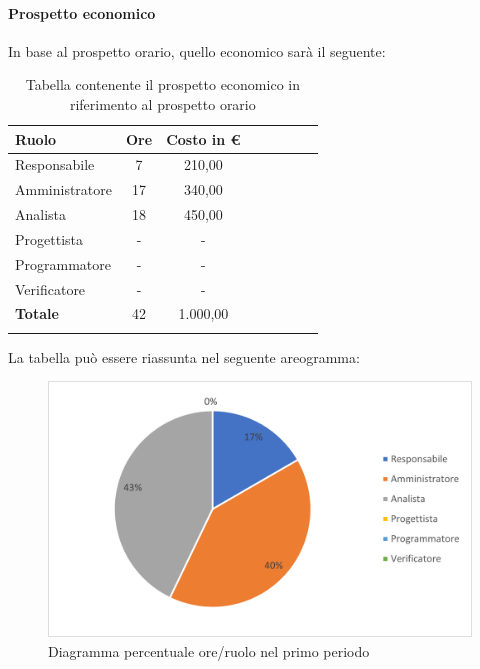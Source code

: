 \paragraph{Prospetto economico}
In base al prospetto orario, quello economico sarà il seguente:

\begin{longtable}{|l|c|c|c|c|c|c|c|}
	\hline
	\rowcolor{lighter-grayer}
	\textbf{Ruolo}  & \textbf{Ore} & \textbf{Costo in €} \\
	\hline
	\endfirsthead

	\hline
	Responsabile    & 7            & 210,00              \\
	\hline
	\hline
	Amministratore  & 17           & 340,00              \\
	\hline
	\hline
	Analista        & 18           & 450,00              \\
	\hline
	\hline
	Progettista     & -            & -                   \\
	\hline
	\hline
	Programmatore   & -            & -                   \\
	\hline
	\hline
	Verificatore    & -            & -                   \\
	\hline
	\textbf{Totale} & 42           & 1.000,00            \\
	\hline
	\rowcolor{white}
	\caption{Tabella contenente il prospetto economico in riferimento al prospetto orario}
\end{longtable}
\pagebreak

La tabella può essere riassunta nel seguente areogramma:
\begin{figure}[H]
	\centering
	\includegraphics[width=0.8\linewidth]{res/images/preventivo/dettaglio_analisi/1-2.png}
	\caption{Diagramma percentuale ore/ruolo nel primo periodo}
	\label{fig:diagramma costi ruolo  primo periodo analisi}
\end{figure}

